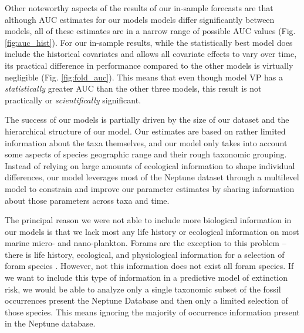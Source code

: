 \documentclass[12pt,letterpaper]{article}
\begin{document}
\begin{refsection}
Other noteworthy aspects of the results of our in-sample forecasts are that although AUC estimates for our models models differ significantly between models, all of these estimates are in a narrow range of possible AUC values (Fig. \ref{fig:auc_hist}). For our in-sample results, while the statistically best model does include the historical covariates and allows all covariate effects to vary over time, its practical difference in performance compared to the other models is virtually negligible (Fig. \ref{fig:fold_auc}). This means that even though model VP has a \textit{statistically} greater AUC than the other three models, this result is not practically or \textit{scientifically} significant. 


The success of our models is partially driven by the size of our dataset and the hierarchical structure of our model. Our estimates are based on rather limited information about the taxa themselves, and our model only takes into account some aspects of species geographic range and their rough taxonomic grouping. Instead of relying on large amounts of ecological information to shape individual differences, our model leverages most of the Neptune dataset through a multilevel model to constrain and improve our parameter estimates by sharing information about those parameters across taxa and time.

The principal reason we were not able to include more biological information in our models is that we lack most any life history or ecological information on most marine micro- and nano-plankton. Forams are the exception to this problem -- there is life history, ecological, and physiological information for a selection of foram species \citep{Ezard2011}. However, not this information does not exist all foram species. If we want to include this type of information in a predictive model of extinction risk, we would be able to analyze only a single taxonomic subset of the fossil occurrences present the Neptune Database and then only a limited selection of those species. This means ignoring the majority of occurrence information present in the Neptune database.


\end{refsection}
\end{document}
